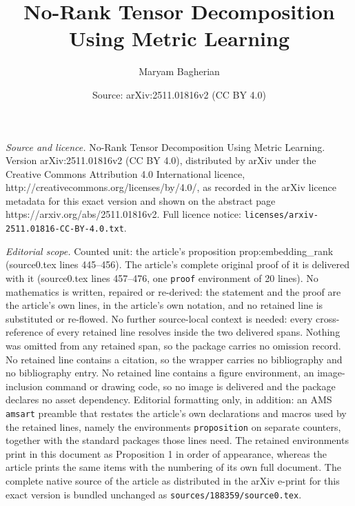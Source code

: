 \documentclass[10pt,a4paper]{amsart}
\title{No-Rank Tensor Decomposition Using Metric Learning}
\author{Maryam Bagherian}
\date{Source: arXiv:2511.01816v2 (CC BY 4.0)}
\begin{document}
\maketitle

\noindent\emph{Source and licence.} No-Rank Tensor Decomposition Using Metric Learning. Version arXiv:2511.01816v2 (CC BY 4.0), distributed by arXiv under the Creative Commons Attribution 4.0 International licence, http://creativecommons.org/licenses/by/4.0/, as recorded in the arXiv licence metadata for this exact version and shown on the abstract page https://arxiv.org/abs/2511.01816v2. Full licence notice: \texttt{licenses/arxiv-2511.01816-CC-BY-4.0.txt}.\par\smallskip

\noindent\textit{Editorial scope.} Counted unit: the article's proposition prop:embedding\_rank (source0.tex lines 445--456). The article's complete original proof of it is delivered with it (source0.tex lines 457--476, one \texttt{proof} environment of 20 lines). No mathematics is written, repaired or re-derived: the statement and the proof are the article's own lines, in the article's own notation, and no retained line is substituted or re-flowed.  No further source-local context is needed: every cross-reference of every retained line resolves inside the two delivered spans.  Nothing was omitted from any retained span, so the package carries no omission record.  No retained line contains a citation, so the wrapper carries no bibliography and no bibliography entry.  No retained line contains a figure environment, an image-inclusion command or drawing code, so no image is delivered and the package declares no asset dependency.  Editorial formatting only, in addition: an AMS \texttt{amsart} preamble that restates the article's own declarations and macros used by the retained lines, namely the environments \texttt{proposition} on separate counters, together with the standard packages those lines need.  The retained environments print in this document as Proposition 1 in order of appearance, whereas the article prints the same items with the numbering of its own full document.  The complete native source of the article as distributed in the arXiv e-print for this exact version is bundled unchanged as \texttt{sources/188359/source0.tex}.
\end{document}
